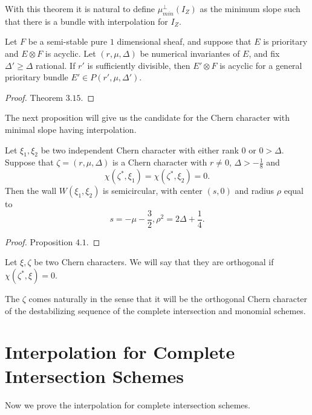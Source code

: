 \documentclass[
	oldfontcommands,
	sumario=abnt-6027-2012,
	12pt,			%
	openright,		%
	oneside,		%
	a4paper,		%
	english,		%
	brazil			%
	]{imecc-unicamp}
\begin{document}
With this theorem it is natural to define $\mu_{min}^\perp(I_Z)$ as the minimum slope such that there is a bundle with interpolation for $I_Z$. 

\begin{teorema}\label{Teo 3.15}
	Let $F$ be a semi-stable pure $1$ dimensional sheaf, and suppose that $E$ is prioritary and $E\otimes F$ is acyclic. Let $(r,\mu,\Delta)$ be numerical invariantes of $E$, and fix $\Delta'\geq \Delta$ rational. If $r'$ is sufficiently divisible, then $E'\otimes F$ is acyclic for a general prioritary bundle $E'\in P(r',\mu,\Delta')$.
\end{teorema}
\begin{proof}
	\cite{COSKUN} Theorem $3.15$.
\end{proof}
The next proposition will give us the candidate for the Chern character with minimal slope having interpolation.

\begin{proposition}\label{prop 4}
	Let $\xi_1,\xi_2$ be two independent Chern character with either rank $0$ or $0>\Delta$. Suppose that $\zeta=(r,\mu,\Delta)$ is a Chern character with $r\neq 0$, $\Delta >-\frac{1}{8}$ and $$
	\chi(\zeta^*,\xi_1)=\chi(\zeta^*,\xi_2)=0.
	$$
	Then the wall $W(\xi_1,\xi_2)$ is semicircular, with center $(s,0)$ and radius $\rho$ equal to $$
	s=-\mu-\frac{3}{2}, \rho^2=2\Delta+\frac{1}{4}.
	$$
\end{proposition}
\begin{proof}
	
	\cite{COSKUN} Proposition $4.1$.
\end{proof}

\begin{definition}
	Let $\xi, \zeta$ be two Chern characters. We will say that they are orthogonal if $\chi(\zeta^*,\xi)=0$.
\end{definition}

The $\zeta$ comes naturally in the sense that it will be the orthogonal Chern character of the destabilizing sequence of the complete intersection and monomial schemes. 

\section{Interpolation for Complete Intersection Schemes}

Now we prove the interpolation for complete intersection schemes.
\end{document}

